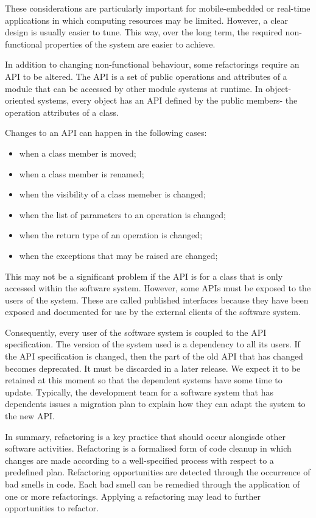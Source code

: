 \documentclass[a4paper, openany]{memoir}
\begin{document}
These considerations are particularly important for mobile-embedded or real-time applications in which computing resources may be limited. However, a clear design is usually easier to tune. This way, over the long term, the required non-functional properties of the system are easier to achieve.

In addition to changing non-functional behaviour, some refactorings require an API to be altered. The API is a set of public operations and attributes of a module that can be accessed by other module systems at runtime. In object-oriented systems, every object has an API defined by the public members- the operation attributes of a class.

Changes to an API can happen in the following cases:
\begin{itemize}
    \item when a class member is moved;
    \item when a class member is renamed;
    \item when the visibility of a class memeber is changed;
    \item when the list of parameters to an operation is changed;
    \item when the return type of an operation is changed;
    \item when the exceptions that may be raised are changed;
\end{itemize}

This may not be a significant problem if the API is for a class that is only accessed within the software system. However, some APIs must be exposed to the users of the system. These are called published interfaces because they have been exposed and documented for use by the external clients of the software system.

Consequently, every user of the software system is coupled to the API specification. The version of the system used is a dependency to all its users. If the API specification is changed, then the part of the old API that has changed becomes deprecated. It must be discarded in a later release. We expect it to be retained at this moment so that the dependent systems have some time to update. Typically, the development team for a software system that has dependents issues a migration plan to explain how they can adapt the system to the new API.

In summary, refactoring is a key practice that should occur alongisde other software activities. Refactoring is a formalised form of code cleanup in which changes are made according to a well-specified process with respect to a predefined plan. Refactoring opportunities are detected through the occurrence of bad smells in code. Each bad smell can be remedied through the application of one or more refactorings. Applying a refactoring may lead to further opportunities to refactor.
\end{document}
